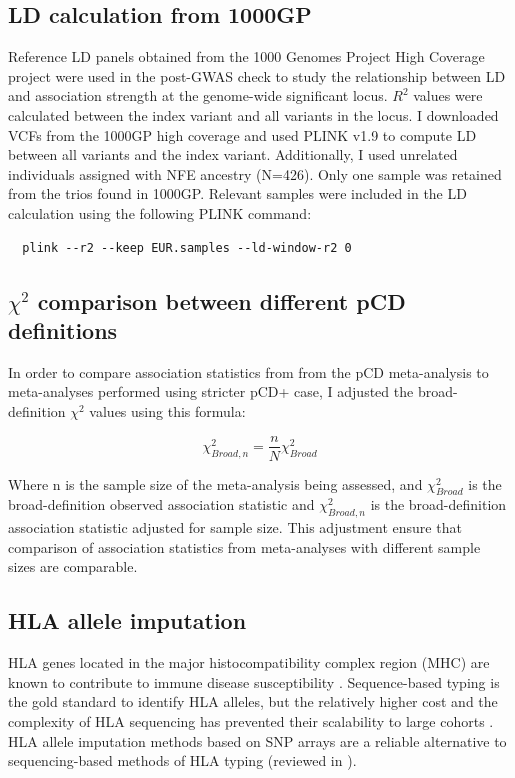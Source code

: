 \subsection{LD calculation from 1000GP}
Reference LD panels obtained from the 1000 Genomes Project High Coverage project \cite{1000gphc} were used in the post-GWAS check to study the relationship between LD and association strength at the genome-wide significant locus. $R^{2}$ values were calculated between the index variant and all variants in the locus. I downloaded VCFs from the 1000GP high coverage and used PLINK v1.9 to compute LD between all variants and the index variant. Additionally, I used unrelated individuals assigned with NFE ancestry (N=426). Only one sample was retained from the trios found in 1000GP. Relevant samples were included in the LD calculation using the following PLINK command:
\begin{verbatim}
  plink --r2 --keep EUR.samples --ld-window-r2 0 
\end{verbatim}

\subsection{$\chi^{2}$ comparison between different pCD definitions}
In order to compare association statistics from from the pCD meta-analysis to meta-analyses performed using stricter pCD+ case, I adjusted the broad-definition $\chi^{2}$ values using this formula:

 $$\chi^{2}_{Broad,n}=\frac{n}{N}\chi^{2}_{Broad}$$

Where n is the sample size of the meta-analysis being assessed, and $\chi^{2}_{Broad}$ is the broad-definition observed association statistic and  $\chi^{2}_{Broad,n}$ is the broad-definition association statistic adjusted for sample size. This adjustment ensure that comparison of association statistics from meta-analyses with different sample sizes are comparable.


\subsection{HLA allele imputation}
HLA genes located in the major histocompatibility complex region (MHC) are known to contribute to immune disease susceptibility \cite{Shiina2009-wt}. Sequence-based typing is the gold standard to identify HLA alleles, but the relatively higher cost and the complexity of HLA sequencing has prevented their scalability to large cohorts \cite{Beksac2014-gm}. HLA allele imputation methods based on SNP arrays are a reliable alternative to sequencing-based methods of HLA typing \cite{De_Bakker2006-ho,Monsuur2008-fk,Jia2013-mh,Zheng2014-mj,Cook2021-px,Naito2021-jl} (reviewed in \cite{Naito2022-qy}). \\

